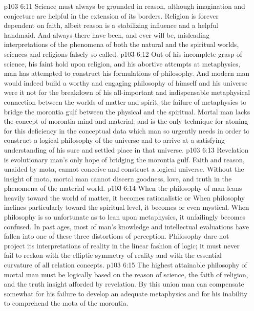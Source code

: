 \vs p103 6:11 \pc Science must always be grounded in reason, although imagination and conjecture are helpful in the extension of its borders. Religion is forever dependent on faith, albeit reason is a stabilizing influence and a helpful handmaid. And always there have been, and ever will be, misleading interpretations of the phenomena of both the natural and the spiritual worlds, sciences and religions falsely so called.
\vs p103 6:12 Out of his incomplete grasp of science, his faint hold upon religion, and his abortive attempts at metaphysics, man has attempted to construct his formulations of philosophy. And modern man would indeed build a worthy and engaging philosophy of himself and his universe were it not for the breakdown of his all\hyp{}important and indispensable metaphysical connection between the worlds of matter and spirit, the failure of metaphysics to bridge the morontia gulf between the physical and the spiritual. Mortal man lacks the concept of morontia mind and material; and  is the only technique for atoning for this deficiency in the conceptual data which man so urgently needs in order to construct a logical philosophy of the universe and to arrive at a satisfying understanding of his sure and settled place in that universe.
\vs p103 6:13 Revelation is evolutionary man’s only hope of bridging the morontia gulf. Faith and reason, unaided by mota, cannot conceive and construct a logical universe. Without the insight of mota, mortal man cannot discern goodness, love, and truth in the phenomena of the material world.
\vs p103 6:14 When the philosophy of man leans heavily toward the world of matter, it becomes rationalistic or  When philosophy inclines particularly toward the spiritual level, it becomes  or even mystical. When philosophy is so unfortunate as to lean upon metaphysics, it unfailingly becomes  confused. In past ages, most of man’s knowledge and intellectual evaluations have fallen into one of these three distortions of perception. Philosophy dare not project its interpretations of reality in the linear fashion of logic; it must never fail to reckon with the elliptic symmetry of reality and with the essential curvature of all relation concepts.
\vs p103 6:15 The highest attainable philosophy of mortal man must be logically based on the reason of science, the faith of religion, and the truth insight afforded by revelation. By this union man can compensate somewhat for his failure to develop an adequate metaphysics and for his inability to comprehend the mota of the morontia.
